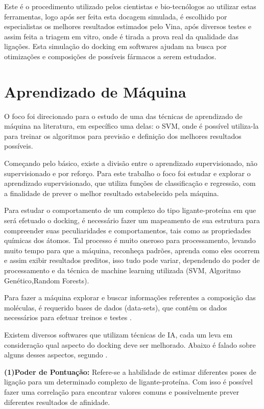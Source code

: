 \documentclass[tcc, capa]{texucpel}
\begin{document}
Este é o procedimento utilizado pelos cientistas e bio-tecnólogos ao utilizar estas ferramentas, logo após ser feita esta docagem simulada, é escolhido por especialistas os melhores resultados estimados pelo Vina, após diversos testes e assim feita a triagem em vitro, onde é tirada a prova real da qualidade das ligações.
Esta simulação do docking em softwares ajudam na busca por otimizações e composições de possíveis fármacos a serem estudados.

\section{Aprendizado de Máquina }

O foco foi direcionado para o estudo de uma das técnicas de aprendizado de máquina na literatura, em específico uma delas: o SVM, onde é possível utiliza-la para treinar os algoritmos para previsão e definição dos melhores resultados possíveis. 

Começando pelo básico, existe a divisão entre o aprendizado supervisionado, não supervisionado e por reforço.
Para este trabalho o foco foi estudar e explorar o aprendizado supervisionado, que utiliza funções de classificação e regressão\cite{boos2017funccoes},
com a finalidade de prever o melhor resultado estabelecido pela máquina.

Para estudar o comportamento de um complexo do tipo ligante-proteína em que será efetuado o docking, é necessário fazer um mapeamento de sua estrutura para compreender suas peculiaridades e comportamentos, tais como as propriedades químicas dos átomos. 
Tal processo é muito oneroso para processamento, levando muito tempo para que a máquina, reconheça padrões, aprenda como eles ocorrem e assim exibir resultados preditos, isso tudo pode variar, dependendo do poder de processamento e da técnica de machine learning utilizada (SVM, Algoritmo Genético,Random Forests).

Para fazer a máquina explorar e buscar informações referentes a composição das moléculas, é requerido bases de dados (data-sets), que contêm os dados necessários para efetuar treinos e testes \cite{chakrabarti2000data}.

Existem diversos softwares que utilizam técnicas de IA, cada um leva em consideração qual aspecto do docking deve ser melhorado. Abaixo é falado sobre alguns desses aspectos, segundo \cite{khamis2015machine}.

\textbf{(1)Poder de Pontuação:} Refere-se a habilidade de estimar diferentes poses de ligação para um determinado complexo de ligante-proteína. Com isso é possível fazer uma correlação para encontrar valores comuns e possivelmente prever diferentes resultados de afinidade.
\end{document}
